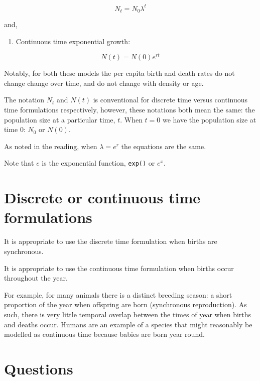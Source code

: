 \documentclass[
]{book}
\providecommand{\tightlist}{%
  \setlength{\itemsep}{0pt}\setlength{\parskip}{0pt}}
\begin{document}
\begin{equation}
N_t = N_0\lambda^t
\label{eq:Geo}
\end{equation}

and,

\begin{enumerate}
\def\labelenumi{\arabic{enumi})}
\setcounter{enumi}{1}
\tightlist
\item
  Continuous time exponential growth:
\end{enumerate}

\begin{equation}
N(t) = N(0)e^{rt}
\label{eq:Exp}
\end{equation}

Notably, for both these models the per capita birth and death rates do not change change over time, and do not change with density or age.

The notation \(N_t\) and \(N(t)\) is conventional for discrete time versus continuous time formulations respectively, however, these notations both mean the same: the population size at a particular time, \(t\). When \(t=0\) we have the population size at time 0: \(N_0\) or \(N(0)\).

As noted in the reading, when \(\lambda = e^{r}\) the equations are the same.

Note that \(e\) is the exponential function, \texttt{exp()} or \(e^x\).

\hypertarget{discrete-or-continuous-time-formulations}{%
\section{Discrete or continuous time formulations}\label{discrete-or-continuous-time-formulations}}

It is appropriate to use the discrete time formulation when births are synchronous.

It is appropriate to use the continuous time formulation when births occur throughout the year.

For example, for many animals there is a distinct breeding season: a short proportion of the year when offspring are born (synchronous reproduction). As such, there is very little temporal overlap between the times of year when births and deaths occur. Humans are an example of a species that might reasonably be modelled as continuous time because babies are born year round.

\hypertarget{questions-1}{%
\section{Questions}\label{questions-1}}
\end{document}
